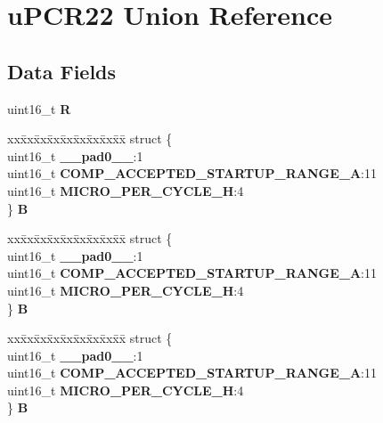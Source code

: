 \hypertarget{unionuPCR22}{}\section{u\+P\+C\+R22 Union Reference}
\label{unionuPCR22}
\subsection*{Data Fields}
\begin{DoxyCompactItemize}
\item 
\mbox{\label{unionuPCR22_ac5ecdd92b6ddd864ea817624a5c8250e}} 
uint16\+\_\+t {\bfseries R}
\item 
\mbox{\label{unionuPCR22_ac28cce24551db5bfa0ea5236439124e8}} 
\begin{tabbing}
xx\=xx\=xx\=xx\=xx\=xx\=xx\=xx\=xx\=\kill
struct \{\\
\>uint16\_t {\bfseries \_\_pad0\_\_}:1\\
\>uint16\_t {\bfseries COMP\_ACCEPTED\_STARTUP\_RANGE\_A}:11\\
\>uint16\_t {\bfseries MICRO\_PER\_CYCLE\_H}:4\\
\} {\bfseries B}\\

\end{tabbing}\item 
\mbox{\label{unionuPCR22_ab447e7b1eb3459cce256c0b8ab06c4f7}} 
\begin{tabbing}
xx\=xx\=xx\=xx\=xx\=xx\=xx\=xx\=xx\=\kill
struct \{\\
\>uint16\_t {\bfseries \_\_pad0\_\_}:1\\
\>uint16\_t {\bfseries COMP\_ACCEPTED\_STARTUP\_RANGE\_A}:11\\
\>uint16\_t {\bfseries MICRO\_PER\_CYCLE\_H}:4\\
\} {\bfseries B}\\

\end{tabbing}\item 
\mbox{\label{unionuPCR22_a29414c9c91c919fe023f3d2ea0443842}} 
\begin{tabbing}
xx\=xx\=xx\=xx\=xx\=xx\=xx\=xx\=xx\=\kill
struct \{\\
\>uint16\_t {\bfseries \_\_pad0\_\_}:1\\
\>uint16\_t {\bfseries COMP\_ACCEPTED\_STARTUP\_RANGE\_A}:11\\
\>uint16\_t {\bfseries MICRO\_PER\_CYCLE\_H}:4\\
\} {\bfseries B}\\


\end{tabbing}
\end{DoxyCompactItemize}
